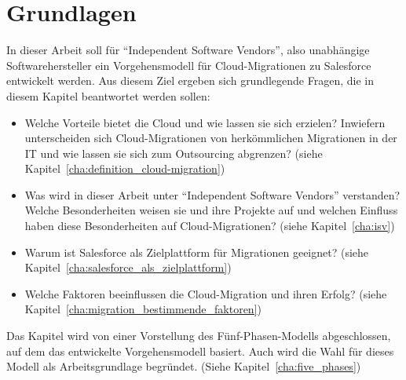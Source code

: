 \section{Grundlagen}



In dieser Arbeit soll für "`Independent Software Vendors"', also unabhängige 
Softwarehersteller ein Vorgehensmodell für Cloud-Migrationen zu Salesforce 
entwickelt werden. Aus diesem Ziel ergeben sich grundlegende Fragen, die in 
diesem Kapitel beantwortet werden sollen:
\begin{itemize}
	\item Welche Vorteile bietet die Cloud und wie lassen sie sich 
erzielen? Inwiefern unterscheiden sich Cloud-Migrationen von herkömmlichen 
Migrationen in der IT und wie lassen sie sich zum Outsourcing abgrenzen? (siehe 
Kapitel~\ref{cha:definition_cloud-migration})
	\item Was wird in dieser Arbeit unter "`Independent Software Vendors"' 
verstanden? Welche Besonderheiten weisen sie und ihre Projekte auf und welchen 
Einfluss haben diese Besonderheiten auf Cloud-Migrationen? (siehe 
Kapitel~\ref{cha:isv})
	\item Warum ist Salesforce als Zielplattform für Migrationen 
geeignet? (siehe Kapitel~\ref{cha:salesforce_als_zielplattform})
	\item Welche Faktoren beeinflussen die Cloud-Migration und ihren 
Erfolg? (siehe Kapitel~\ref{cha:migration_bestimmende_faktoren})
\end{itemize}
Das Kapitel wird von einer Vorstellung des Fünf-Phasen-Modells abgeschlossen, 
auf dem das entwickelte Vorgehensmodell basiert. Auch wird die Wahl für dieses 
Modell als Arbeitsgrundlage begründet. (Siehe Kapitel~\ref{cha:five_phases})

